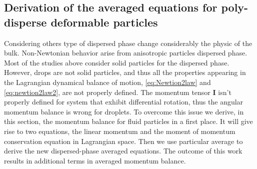 \subsection{Derivation of the averaged equations for poly-disperse deformable particles}
Considering others type of dispersed phase change considerably the physic of the bulk. 
Non-Newtonian behavior arise from anisotropic particles dispersed phase.
Most of the studies above consider solid particles for the dispersed phase.
However, drops are not solid particles, and thus all the properties appearing in the Lagrangian dynamical balance of motion, \ref{eq:Newtion2law} and \ref{eq:newtion2law2}, are not properly defined. 
The momentum tensor $\bm{I}$ isn't properly defined for system that exhibit differential rotation, thus the angular momentum balance is wrong for droplets.
To overcome this issue we derive, in this section, the momentum balance for fluid particles in a first place.
It will give rise to two equations, the linear momentum and the moment of momentum conservation equation in Lagrangian space. 
Then we use particular average to derive the  new dispersed-phase averaged equations. 
The outcome of this work results in additional terms in averaged momentum balance.

